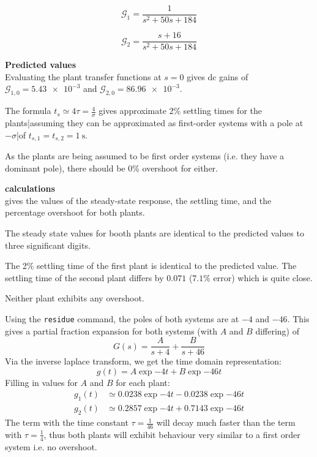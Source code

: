 \problem

\begin{equation}
	\label{eq:p3 plant 1}
	\mathcal{G}_1 = \frac{1}{s^2 + 50 s + 184}
\end{equation}

\begin{equation}
	\label{eq:p3 plant 2}
	\mathcal{G}_2 = \frac{s+16}{s^2 + 50 s + 184}
\end{equation}

\smallskip
\large\textbf{Predicted values}\\
Evaluating the plant transfer functions at $s=0$ gives dc gains of $\mathcal{G}_{1,0}=\num{5.43e-3}$ and $\mathcal{G}_{2,0}=\num{86.96e-3}$.

The formula $t_s\simeq 4\tau=\frac{4}{\sigma}$ gives approximate 2\% settling times for the plants|assuming they can be approximated as first-order systems with a pole at $-\sigma$|of $t_{s,1}=t_{s,2}=\SI{1}{\second}$.

As the plants are being assumed to be first order systems (i.e. they have a dominant pole), there should be 0\% overshoot for either.

\smallskip
\large\textbf{\matlab calculations}\\
 gives the values of the steady-state response, the settling time, and the percentage overshoot for both plants.

The steady state values for booth plants are identical to the predicted values to three significant digits.

The 2\% settling time of the first plant is identical to the predicted value. The settling time of the second plant differs by $0.071$ ($7.1\%$ error) which is quite close.

Neither plant exhibits any overshoot.\\


Using the \texttt{residue} command, the poles of both systems are at $-4$ and $-46$. This gives a partial fraction expansion for both systems (with $A$ and $B$ differing) of 
$$
G(s) = \frac{A}{s+4}+\frac{B}{s+46}
$$
Via the inverse laplace transform, we get the time domain representation:
$$
g(t) = A\exp{-4t}+B\exp{-46t}
$$
Filling in values for $A$ and $B$ for each plant:
\begin{align*}
	g_1(t) &\simeq 0.0238\exp{-4t} - 0.0238\exp{-46t}\\
	g_2(t) &\simeq 0.2857\exp{-4t} + 0.7143\exp{-46t}
\end{align*}
The term with the time constant $\tau=\frac{1}{46}$ will decay much faster than the term with $\tau=\frac{1}{4}$, thus both plants will exhibit behaviour very similar to a first order system i.e. no overshoot.\\

